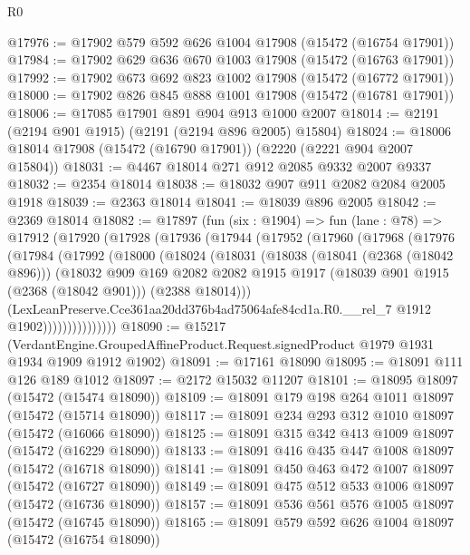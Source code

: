 \begin{lexlean}{R0}
\begin{coremodule}
@17976 := @17902 @579 @592 @626 @1004 @17908 (@15472 (@16754 @17901))
@17984 := @17902 @629 @636 @670 @1003 @17908 (@15472 (@16763 @17901))
@17992 := @17902 @673 @692 @823 @1002 @17908 (@15472 (@16772 @17901))
@18000 := @17902 @826 @845 @888 @1001 @17908 (@15472 (@16781 @17901))
@18006 := @17085 @17901 @891 @904 @913 @1000 @2007
@18014 := @2191 (@2194 @901 @1915) (@2191 (@2194 @896 @2005) @15804)
@18024 := @18006 @18014 @17908 (@15472 (@16790 @17901)) (@2220 (@2221 @904 @2007 @15804))
@18031 := @4467 @18014 @271 @912 @2085 @9332 @2007 @9337
@18032 := @2354 @18014
@18038 := @18032 @907 @911 @2082 @2084 @2005 @1918
@18039 := @2363 @18014
@18041 := @18039 @896 @2005
@18042 := @2369 @18014
@18082 := @17897
    (fun (six : @1904) =>
    fun (lane : @78) =>
    @17912
      (@17920
        (@17928
          (@17936
            (@17944
              (@17952
                (@17960
                  (@17968
                    (@17976
                      (@17984
                        (@17992
                          (@18000
                            (@18024
                              (@18031
                                (@18038
                                  (@18041 (@2368 (@18042 @896)))
                                  (@18032
                                    @909
                                    @169
                                    @2082
                                    @2082
                                    @1915
                                    @1917
                                    (@18039 @901 @1915 (@2368 (@18042 @901)))
                                    (@2388 @18014)))
                                (LexLeanPreserve.Cce361aa20dd376b4ad75064afe84cd1a.R0.__rel_7
                                  @1912
                                  @1902)))))))))))))))
@18090 := @15217
    (VerdantEngine.GroupedAffineProduct.Request.signedProduct @1979 @1931 @1934 @1909 @1912 @1902)
@18091 := @17161 @18090
@18095 := @18091 @111 @126 @189 @1012
@18097 := @2172 @15032 @11207
@18101 := @18095 @18097 (@15472 (@15474 @18090))
@18109 := @18091 @179 @198 @264 @1011 @18097 (@15472 (@15714 @18090))
@18117 := @18091 @234 @293 @312 @1010 @18097 (@15472 (@16066 @18090))
@18125 := @18091 @315 @342 @413 @1009 @18097 (@15472 (@16229 @18090))
@18133 := @18091 @416 @435 @447 @1008 @18097 (@15472 (@16718 @18090))
@18141 := @18091 @450 @463 @472 @1007 @18097 (@15472 (@16727 @18090))
@18149 := @18091 @475 @512 @533 @1006 @18097 (@15472 (@16736 @18090))
@18157 := @18091 @536 @561 @576 @1005 @18097 (@15472 (@16745 @18090))
@18165 := @18091 @579 @592 @626 @1004 @18097 (@15472 (@16754 @18090))

\end{coremodule}
\end{lexlean}
